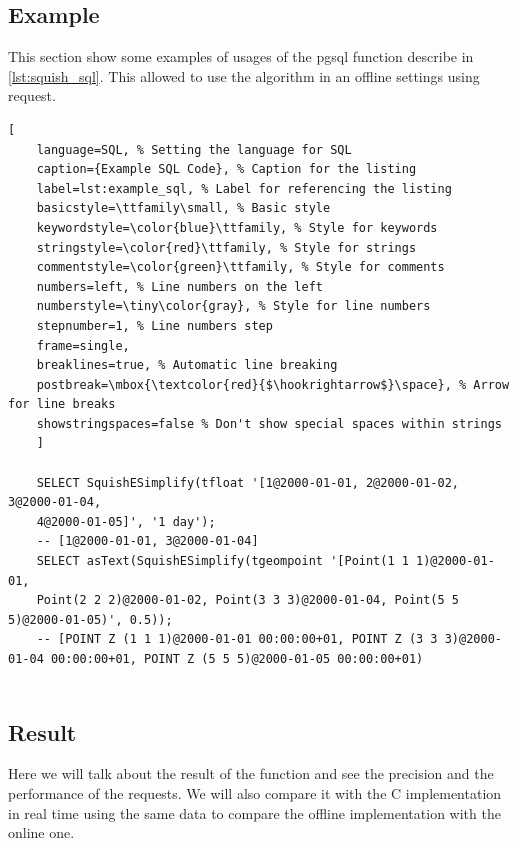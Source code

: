 \documentclass[twoside,12pt, a4paper]{report}
\begin{document}
\subsection{Example}
This section show some examples of usages of the pgsql function describe in \ref{lst:squish_sql}. This allowed to use the algorithm in an offline settings using request. 
\begin{lstlisting}[
	language=SQL, % Setting the language for SQL
	caption={Example SQL Code}, % Caption for the listing
	label=lst:example_sql, % Label for referencing the listing
	basicstyle=\ttfamily\small, % Basic style
	keywordstyle=\color{blue}\ttfamily, % Style for keywords
	stringstyle=\color{red}\ttfamily, % Style for strings
	commentstyle=\color{green}\ttfamily, % Style for comments
	numbers=left, % Line numbers on the left
	numberstyle=\tiny\color{gray}, % Style for line numbers
	stepnumber=1, % Line numbers step
	frame=single,
	breaklines=true, % Automatic line breaking
	postbreak=\mbox{\textcolor{red}{$\hookrightarrow$}\space}, % Arrow for line breaks
	showstringspaces=false % Don't show special spaces within strings
	]
	
	SELECT SquishESimplify(tfloat '[1@2000-01-01, 2@2000-01-02, 3@2000-01-04,
	4@2000-01-05]', '1 day');
	-- [1@2000-01-01, 3@2000-01-04]
	SELECT asText(SquishESimplify(tgeompoint '[Point(1 1 1)@2000-01-01,
	Point(2 2 2)@2000-01-02, Point(3 3 3)@2000-01-04, Point(5 5 5)@2000-01-05)', 0.5));
	-- [POINT Z (1 1 1)@2000-01-01 00:00:00+01, POINT Z (3 3 3)@2000-01-04 00:00:00+01, POINT Z (5 5 5)@2000-01-05 00:00:00+01)
	
\end{lstlisting}

\subsection{Result}

Here we will talk about the result of the function and see the precision and the performance of the requests. We will also compare it with the C implementation in real time using the same data to compare the offline implementation with the online one. 
\end{document}

